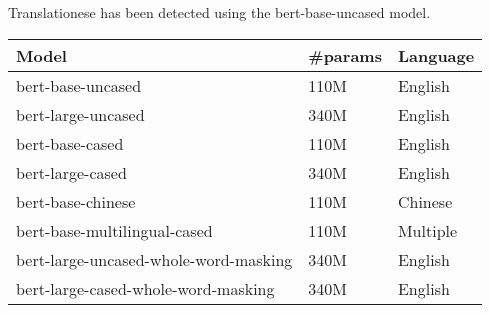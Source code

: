 Translationese has been detected using the bert-base-uncased model.

\begin{center}
    
\begin{tabular}{ |p{8cm}||p{3cm}|p{3cm}|  }
 \hline
Model	&\#params	&Language\\
 \hline
bert-base-uncased	&110M	&English\\
bert-large-uncased	&340M	&English\\
bert-base-cased	&110M	&English\\
bert-large-cased	&340M	&English\\
bert-base-chinese	&110M	&Chinese\\
bert-base-multilingual-cased	&110M	&Multiple\\
bert-large-uncased-whole-word-masking	&340M	&English\\
bert-large-cased-whole-word-masking	&340M	&English\\
 \hline
\end{tabular}

\end{center}